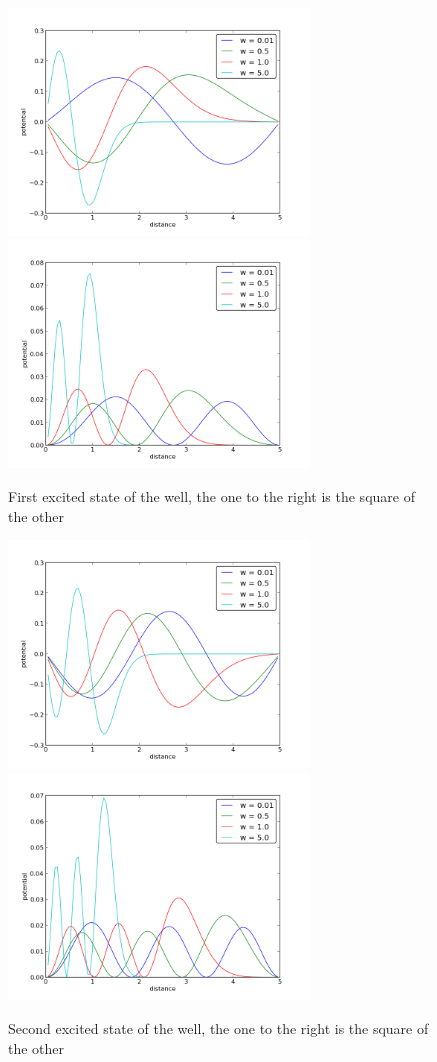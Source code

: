 \documentclass[a4wide,12pt]{article}
\begin{document}
\begin{figure}[p]
	\includegraphics[width=80mm]{electronpotentialexc1}
	\includegraphics[width=80mm]{electronpotentialexc1square}
		\caption{First excited state of the well, the one to the right is the square of the other}
\end{figure}
\begin{figure}[p]
	\includegraphics[width=80mm]{electronpotentialexc2}
	\includegraphics[width=80mm]{electronpotentialexc2square}
		\caption{Second excited state of the well, the one to the right is the square of the other}
\end{figure}	 
\end{document}
